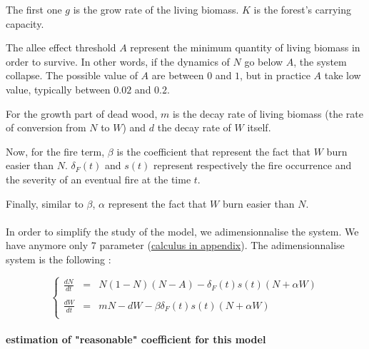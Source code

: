 \documentclass{article}
\begin{document}
The first one $g$ is the grow rate of the living biomass. $K$ is the forest's carrying capacity. 

The allee effect threshold $A$ represent the minimum quantity of living biomass in order to survive. In other words, if the dynamics of $N$ go below $A$, the system collapse. The possible value of $A$ are between $0$ and $1$, but in practice $A$ take low value, typically between $0.02$ and $0.2$.

For the growth part of dead wood, $m$ is the decay rate of living biomass (the rate of conversion from $N$ to $W$) and $d$ the decay rate of $W$ itself.

Now, for the fire term, $\beta$ is the coefficient that represent the fact that $W$ burn easier than $N$. $\delta_F(t)$ and $s(t)$ represent respectively the fire occurrence and the severity of an eventual fire at the time $t$. 

Finally, similar to $\beta$, $\alpha$ represent the fact that $W$ burn easier than $N$.





\paragraph{}
In order to simplify the study of the model, we adimensionnalise the system. We have anymore only 7 parameter (\hyperref[adim]{calculus in appendix}). The adimensionnalise system is the following :

\[ %
\left\lbrace
\begin{array}{rcl}
\frac{dN}{dt} & = & N(1-N)(N-A) - \delta_F(t)s(t)(N+\alpha W) \\
\\
\frac{dW}{dt} & = & mN -dW - \beta\delta_F(t)s(t)(N+\alpha W) \\
\end{array}
\right.
\]

\paragraph{estimation of "reasonable" coefficient for this model%
} \todo{}


\end{document}

